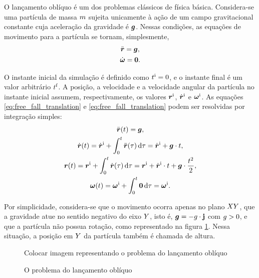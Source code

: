 O lançamento oblíquo é um dos problemas clássicos de física básica. Considera-se uma partícula de massa \(m\) sujeita unicamente à ação de um campo gravitacional constante cuja aceleração da gravidade é \(\bm{g}\). Nessas condições, as equações de movimento para a partícula se tornam, simplesmente,
\begin{gather}
	\acceleration = \gravity, \label{eq:free_fall_translation}\\
	\angularAcceleration = \nullVector \label{eq:free_fall_rotation}.
\end{gather}

O instante inicial da simulação é definido como \(t^{\text{i}}=0\), e o instante final é um valor arbitrário \(t^{\text{f}}\). A posição, a velocidade e a velocidade angular da partícula no instante inicial assumem, respectivamente, os valores \(\bm{r}^{\text{i}}\), \(\initial{\velocity}\) e \(\bm{\omega}^{\text{i}}\). As equações \eqref{eq:free_fall_translation} e \eqref{eq:free_fall_translation} podem ser resolvidas por integração simples:
\begin{gather*}
	\acceleration\pqty{t} = \gravity, \\
	\velocity\pqty{t} = \initial{\velocity} + \int_{0}^{t} \acceleration\pqty{\tau} \dd{\tau} = \initial{\velocity} + \gravity\cdot t, \\
	\position\pqty{t} = \initial{\position} + \int_{0}^{t} \velocity\pqty{\tau} \dd{\tau} = \initial{\position} + \initial{\velocity}\cdot t + \gravity\cdot \dfrac{t^2}{2}, \\
	\angularVelocity\pqty{t} = \initial{\angularVelocity} + \int_{0}^{t} \nullVector \dd{\tau} = \initial{\angularVelocity}.
\end{gather*}

Por simplicidade, considera-se que o movimento ocorra apenas no plano \(XY\), que a gravidade atue no sentido negativo do eixo \(Y\), isto é, \(\bm{g} = -g\cdot\mathbf{j}\) com \(g>0\), e que a partícula não possua rotação, como representado na figura \ref{fig:free_fall}. Nessa situação, a posição em \(Y\) da partícula também é chamada de altura.

\begin{figure}[h]
	\caption{O problema do lançamento oblíquo}
	\begin{center}
		\alert{Colocar imagem representando o problema do lançamento oblíquo}
	\end{center}
	\label{fig:free_fall}
\end{figure}

